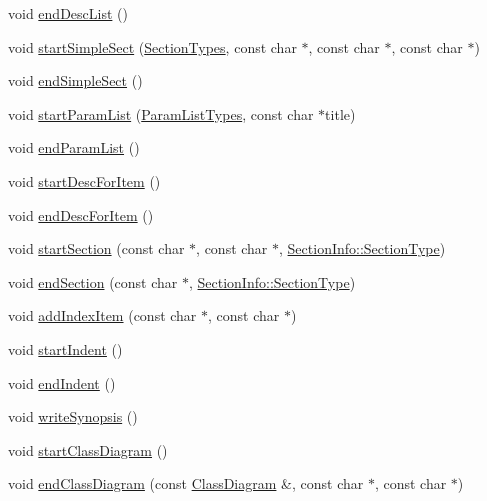 \begin{DoxyCompactItemize}
\item 
void \hyperlink{class_man_generator_aa30427fbbe13113b3fe39bebfe79d1ee}{end\+Desc\+List} ()
\item 
void \hyperlink{class_man_generator_a9071e3acc29d0ec5163b79b41ed9b0fa}{start\+Simple\+Sect} (\hyperlink{class_base_output_doc_interface_a07a3d5df76a714674e070e5e236fe886}{Section\+Types}, const char $\ast$, const char $\ast$, const char $\ast$)
\item 
void \hyperlink{class_man_generator_a727316739c8b0ba879ad127f1373ff10}{end\+Simple\+Sect} ()
\item 
void \hyperlink{class_man_generator_a12ce892150a512ed5803e90ad684dd0a}{start\+Param\+List} (\hyperlink{class_base_output_doc_interface_a944ed4d9fb389999c2724eeb321b8c8c}{Param\+List\+Types}, const char $\ast$title)
\item 
void \hyperlink{class_man_generator_a08de61d7842d7920e0cffe03213f31fb}{end\+Param\+List} ()
\item 
void \hyperlink{class_man_generator_ae826d6dc94da45c9b35bb715ab316656}{start\+Desc\+For\+Item} ()
\item 
void \hyperlink{class_man_generator_a0729f8d1cc066dd6629a0c7bd765bc81}{end\+Desc\+For\+Item} ()
\item 
void \hyperlink{class_man_generator_ad22a90e2eed1e0487fb500674e004e91}{start\+Section} (const char $\ast$, const char $\ast$, \hyperlink{struct_section_info_a32308f52dd59422b14fb75a92c90ebf1}{Section\+Info\+::\+Section\+Type})
\item 
void \hyperlink{class_man_generator_a08b9cad6ac2d759823224b4580c77fd3}{end\+Section} (const char $\ast$, \hyperlink{struct_section_info_a32308f52dd59422b14fb75a92c90ebf1}{Section\+Info\+::\+Section\+Type})
\item 
void \hyperlink{class_man_generator_a290636c8090c771e5fd94e35cce35248}{add\+Index\+Item} (const char $\ast$, const char $\ast$)
\item 
void \hyperlink{class_man_generator_a02774d23b0846b52af4c0b76e0db6c0f}{start\+Indent} ()
\item 
void \hyperlink{class_man_generator_a1d28184243c9614854f089a76a340f23}{end\+Indent} ()
\item 
void \hyperlink{class_man_generator_aec39420ccf2c964a39c97e79e1d2cbc0}{write\+Synopsis} ()
\item 
void \hyperlink{class_man_generator_a68a8a44e48aa4441ed8f522f4f88dc75}{start\+Class\+Diagram} ()
\item 
void \hyperlink{class_man_generator_ac37a68b10d76cc5d8a1125e5060b5211}{end\+Class\+Diagram} (const \hyperlink{class_class_diagram}{Class\+Diagram} \&, const char $\ast$, const char $\ast$)

\end{DoxyCompactItemize}
